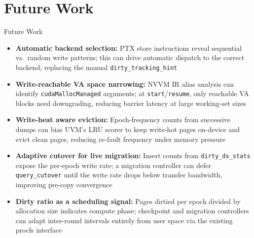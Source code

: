 \section{Future Work}

\begin{frame}{Future Work}
\begin{itemize}[<+->]
    \item \textbf{Automatic backend selection:} PTX store instructions reveal sequential vs.\ random write patterns; this can drive automatic dispatch to the correct backend, replacing the manual \texttt{dirty\_tracking\_hint}
    \item \textbf{Write-reachable VA space narrowing:} NVVM IR alias analysis can identify \texttt{cudaMallocManaged} arguments; at \texttt{start}/\texttt{resume}, only reachable VA blocks need downgrading, reducing barrier latency at large working-set sizes
    \item \textbf{Write-heat aware eviction:} Epoch-frequency counts from successive dumps can bias UVM's LRU scorer to keep write-hot pages on-device and evict clean pages, reducing re-fault frequency under memory pressure
    \item \textbf{Adaptive cutover for live migration:} Insert counts from \texttt{dirty\_ds\_stats} expose the per-epoch write rate; a migration controller can defer \texttt{query\_cutover} until the write rate drops below transfer bandwidth, improving pre-copy convergence
    \item \textbf{Dirty ratio as a scheduling signal:} Pages dirtied per epoch divided by allocation size indicates compute phase; checkpoint and migration controllers can adapt inter-round intervals entirely from user space via the existing procfs interface
\end{itemize}
\end{frame}
